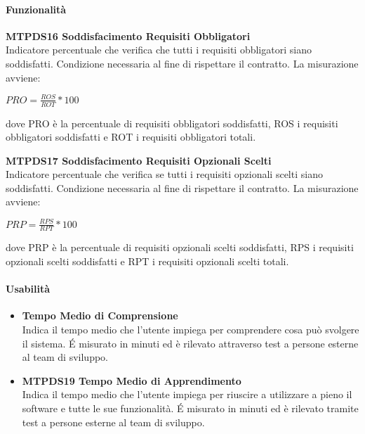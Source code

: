 \paragraph{Funzionalità}
\begin{itemize}

	\item \textbf{MTPDS16 Soddisfacimento Requisiti Obbligatori}\-\\
Indicatore percentuale che verifica che tutti i requisiti obbligatori siano soddisfatti. Condizione necessaria al fine di rispettare il contratto. La misurazione avviene:
\begin{center}
	\item $PRO = \frac{ROS}{ROT}*100$
\end{center}
dove PRO è la percentuale di requisiti obbligatori soddisfatti, ROS i requisiti obbligatori soddisfatti e ROT i requisiti obbligatori totali.

	\item \textbf{MTPDS17 Soddisfacimento Requisiti Opzionali Scelti}\-\\
Indicatore percentuale che verifica se tutti i requisiti opzionali scelti siano soddisfatti. Condizione necessaria al fine di rispettare il contratto. La misurazione avviene:
\begin{center}
	\item $PRP = \frac{RPS}{RPT}*100$
\end{center}
dove PRP è la percentuale di requisiti opzionali scelti soddisfatti, RPS i requisiti opzionali scelti soddisfatti e RPT i requisiti opzionali scelti totali.
\end{itemize}

\paragraph{Usabilità}

\begin{itemize}

	\item\textbf{Tempo Medio di Comprensione}\-\\
Indica il tempo medio che l'utente impiega per comprendere cosa può svolgere il sistema. \'E misurato in minuti ed è rilevato attraverso test a persone esterne al team di sviluppo.

	\item\textbf{MTPDS19 Tempo Medio di Apprendimento}\-\\
Indica il tempo medio che l'utente impiega per riuscire a utilizzare a pieno il software e tutte le sue funzionalità. \'E misurato in minuti ed è rilevato tramite test a persone esterne al team di sviluppo. 

\end{itemize}


